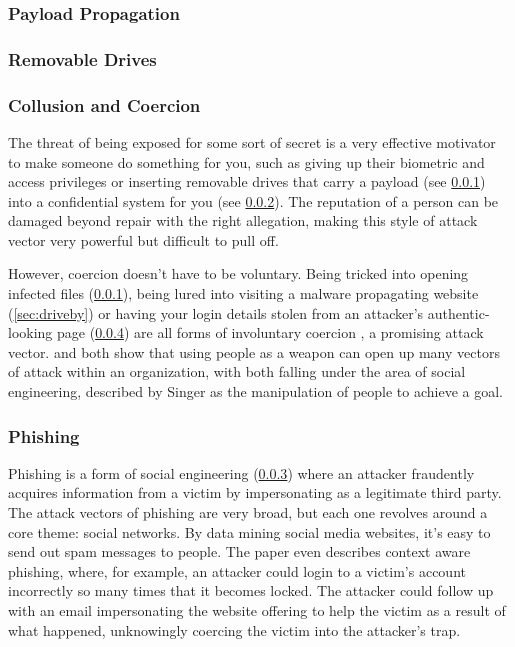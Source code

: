 \documentclass[a4paper, 11pt]{article}
\begin{document}
\subsubsection{Payload Propagation}
\label{sec:payloads}

\subsubsection{Removable Drives}
\label{sec:removabledrives}

\subsubsection{Collusion and Coercion}
\label{sec:coercion}
The threat of being exposed for some sort of secret is a very effective motivator to make someone do something for you, such as giving up their biometric and access privileges \cite{ref:biometricattackvectors} or inserting removable drives that carry a payload (see \ref{sec:payloads}) into a confidential system for you (see \ref{sec:removabledrives}). The reputation of a person can be damaged beyond repair with the right allegation, making this style of attack vector very powerful but difficult to pull off.

However, coercion doesn't have to be voluntary. Being tricked into opening infected files (\ref{sec:payloads}), being lured into visiting a malware propagating website (\ref{sec:driveby}) or having your login details stolen from an attacker's authentic-looking page (\ref{sec:phishing}) are all forms of involuntary coercion \cite{ref:jang2014survey,ref:singer2014cybersecurity}, a promising attack vector. \cite{ref:biometricattackvectors} and \cite{ref:jang2014survey} both show that using people as a weapon can open up many vectors of attack within an organization, with both falling under the area of social engineering, described by Singer \cite{ref:singer2014cybersecurity} as the manipulation of people to achieve a goal.

\subsubsection{Phishing}
\label{sec:phishing}
Phishing is a form of social engineering (\ref{sec:coercion}) where an attacker fraudently acquires information from a victim by impersonating as a legitimate third party. \cite{ref:phishing} The attack vectors of phishing are very broad, but each one revolves around a core theme: social networks. By data mining social media websites, it's easy to send out spam messages to people. \cite{ref:phishing} The paper even describes context aware phishing, where, for example, an attacker could login to a victim's account incorrectly so many times that it becomes locked. The attacker could follow up with an email impersonating the website offering to help the victim as a result of what happened, unknowingly coercing the victim into the attacker's trap.
\end{document}
